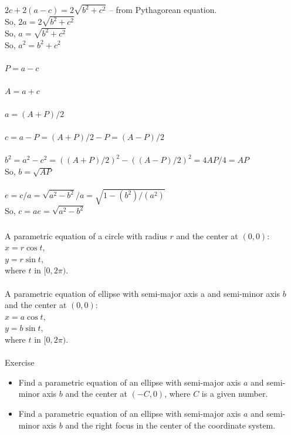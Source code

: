 \documentclass[aspectratio=169,xcolor=pdftex,dvipsnames]{beamer} %
\begin{document}

\begin{frame}
\frametitle{}

$2c + 2(a-c) = 2 \sqrt{b^2 + c^2}$ -- from Pythagorean equation.\\
So, $2a = 2 \sqrt{b^2 + c^2}$\\
So, $a = \sqrt{b^2 + c^2}$\\
So, $a^2 = b^2 + c^2$\\
\ \\
$P = a-c$\\
\ \\
$A = a+c$\\
\ \\
$a = (A+P)/2$\\
\ \\
$c = a-P = (A+P)/2 - P = (A-P)/2$\\
\ \\
$b^2 = a^2 - c^2 = ((A+P)/2)^2 - ((A-P)/2)^2 = 4 AP/4 = AP$\\
So, $b = \sqrt{AP}$\\
\ \\
$e = c/a = \sqrt{a^2-b^2} / a = \sqrt{1- (b^2)/(a^2)}$\\
So, $c = ae = \sqrt{a^2-b^2}$

\end{frame}


\begin{frame}
\frametitle{}

A parametric equation of a circle with radius $r$ and the center at $(0,0)$:\\
$x = r \cos t$,\\
$y = r \sin t$,\\
where $t$ in $[0, 2\pi)$.\\
\ \\
A parametric equation of ellipse with semi-major axis a and semi-minor axis $b$
and the center at $(0,0)$:\\
$x = a \cos t$,\\
$y = b \sin t$,\\
where $t$ in $[0, 2\pi)$.\\
\ \\
Exercise\\
\begin{itemize}
\item
Find a parametric equation of an ellipse with semi-major axis $a$ and semi-minor axis $b$
and the center at $(-C,0)$, where $C$ is a given number.
\item
Find a parametric equation of an ellipse with semi-major axis $a$ and semi-minor axis $b$
and the right focus in the center of the coordinate system.
\end{itemize}

\end{frame}
\end{document}
